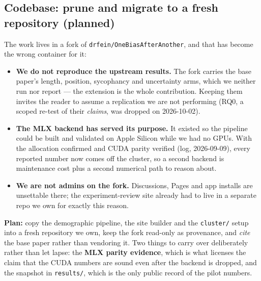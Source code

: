 \documentclass{article}
\begin{document}
\subsection*{Codebase: prune and migrate to a fresh repository (planned)}
The work lives in a fork of \texttt{drfein/OneBiasAfterAnother}, and that has become the wrong container for
it:
\begin{itemize}
  \item \textbf{We do not reproduce the upstream results.} The fork carries the base paper's length,
        position, sycophancy and uncertainty arms, which we neither run nor report --- the extension is the
        whole contribution. Keeping them invites the reader to assume a replication we are not performing
        (RQ0, a scoped re-test of their \emph{claims}, was dropped on 2026-10-02).
  \item \textbf{The MLX backend has served its purpose.} It existed so the pipeline could be built and
        validated on Apple Silicon while we had no GPUs. With the allocation confirmed and CUDA parity
        verified (log, 2026-09-09), every reported number now comes off the cluster, so a second backend is
        maintenance cost plus a second numerical path to reason about.
  \item \textbf{We are not admins on the fork.} Discussions, Pages and app installs are unsettable there;
        the experiment-review site already had to live in a separate repo we own for exactly this reason.
\end{itemize}
\noindent \textbf{Plan:} copy the demographic pipeline, the site builder and the \texttt{cluster/} setup into
a fresh repository we own, keep the fork read-only as provenance, and \emph{cite} the base paper rather than
vendoring it. Two things to carry over deliberately rather than let lapse: the \textbf{MLX parity evidence},
which is what licenses the claim that the CUDA numbers are sound even after the backend is dropped, and the
snapshot in \texttt{results/}, which is the only public record of the pilot numbers.
\end{document}
